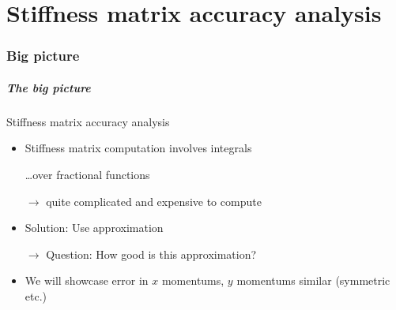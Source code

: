 \documentclass{beamer}
\renewcommand{\phi}{\varphi}
\begin{document}

\part{Stiffness matrix accuracy analysis}
\label{part:stiffness-matrix-accuracy-analysis}

\section{Big picture}
\label{sec:stiffness-big-picture}

\begin{frame}
  \frametitle{The big picture}
  \begin{block}{Stiffness matrix accuracy analysis}
    \begin{itemize}
    \item Stiffness matrix computation involves integrals
      
      \dots over fractional functions

      $\rightarrow$ quite complicated and expensive to compute
    \item Solution: Use approximation

      $\rightarrow$ \alert<2>{Question: How good is this approximation?}
    \item We will showcase error in $x$ momentums, $y$ momentums similar (symmetric etc.)
    \end{itemize}
  \end{block}
\end{frame}
\end{document}
